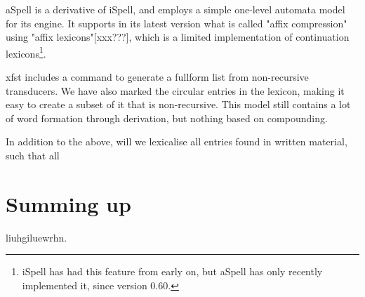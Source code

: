 \documentclass[a4paper,english]{article}
\begin{document}
aSpell is a derivative of iSpell, and employs a simple one-level automata model for its engine. It supports in its latest version what is called "affix compression" using "affix lexicons"[xxx???], which is a limited implementation of continuation lexicons\footnote{iSpell has had this feature from early on, but aSpell has only recently implemented it, since version 0.60.}.

xfst includes a command to generate a fullform list from non-recursive transducers. We have also marked the circular entries in the lexicon, making it easy to create a subset of it that is non-recursive. This model still contains a lot of word formation through derivation, but nothing based on compounding.

In addition to the above, will we lexicalise all entries found in written material, such that all 

\section{Summing up}

liuhgiluewrhn.

 



\end{document}
